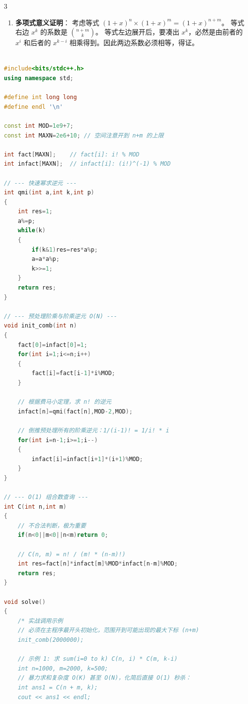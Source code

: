 \documentclass[10pt,landscape,a4paper]{article}
\begin{document}
\begin{multicols*}{3}
\begin{enumerate}[start=1]
\textbf{推导技巧}：利用对称性把第一项变成 $\binom{n}{n-i}$，此时上下标之和 $(n-i) + (i+k) = n+k$ 变为定值，即可套用基础公式。\par
\item \textbf{多项式意义证明}：
考虑等式 $(1+x)^n \times (1+x)^m = (1+x)^{n+m}$。 等式右边 $x^k$ 的系数是 $\binom{n+m}{k}$。 等式左边展开后，要凑出 $x^k$，必然是由前者的 $x^i$ 和后者的 $x^{k-i}$ 相乘得到。因此两边系数必须相等，得证。\par
\end{enumerate}
\par{}\par
\begin{lstlisting}[language=C++]

#include<bits/stdc++.h>
using namespace std;

#define int long long
#define endl '\n'

const int MOD=1e9+7;
const int MAXN=2e6+10; // 空间注意开到 n+m 的上限

int fact[MAXN];    // fact[i]: i! % MOD
int infact[MAXN];  // infact[i]: (i!)^(-1) % MOD

// --- 快速幂求逆元 ---
int qmi(int a,int k,int p)
{
    int res=1;
    a%=p;
    while(k)
    {
        if(k&1)res=res*a%p;
        a=a*a%p;
        k>>=1;
    }
    return res;
}

// --- 预处理阶乘与阶乘逆元 O(N) ---
void init_comb(int n)
{
    fact[0]=infact[0]=1;
    for(int i=1;i<=n;i++)
    {
        fact[i]=fact[i-1]*i%MOD;
    }
    
    // 根据费马小定理，求 n! 的逆元
    infact[n]=qmi(fact[n],MOD-2,MOD);
    
    // 倒推预处理所有的阶乘逆元：1/(i-1)! = 1/i! * i
    for(int i=n-1;i>=1;i--)
    {
        infact[i]=infact[i+1]*(i+1)%MOD;
    }
}

// --- O(1) 组合数查询 ---
int C(int n,int m)
{
    // 不合法判断，极为重要
    if(n<0||m<0||n<m)return 0;
    
    // C(n, m) = n! / (m! * (n-m)!)
    int res=fact[n]*infact[m]%MOD*infact[n-m]%MOD;
    return res;
}

void solve()
{
    /* 实战调用示例 
    // 必须在主程序最开头初始化，范围开到可能出现的最大下标 (n+m)
    init_comb(2000000); 
    
    // 示例 1: 求 sum(i=0 to k) C(n, i) * C(m, k-i)
    int n=1000, m=2000, k=500;
    // 暴力求和复杂度 O(K) 甚至 O(N)，化简后直接 O(1) 秒杀：
    int ans1 = C(n + m, k); 
    cout << ans1 << endl;
    

\end{lstlisting}
\end{multicols*}
\end{document}
